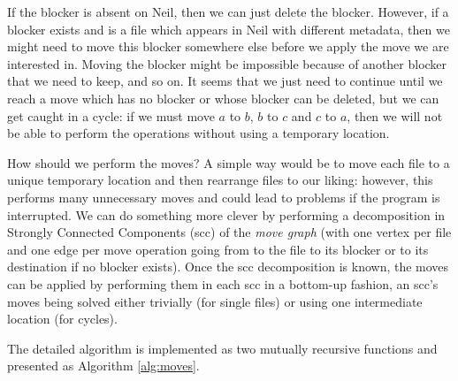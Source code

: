\documentclass[11pt]{llncs}
\begin{document}
If the blocker is absent on Neil, then we can just delete the blocker. However, if a blocker exists and is a file which appears in Neil with different metadata, then we might need to move this blocker somewhere else before we apply the move we are interested in. Moving the blocker might be impossible because of another blocker that we need to keep, and so on. It seems that we just need to continue until we reach a move which has no blocker or whose blocker can be deleted, but we can get caught in a cycle: if we must move $a$ to $b$, $b$ to $c$ and $c$ to $a$, then we will not be able to perform the operations without using a temporary location.

How should we perform the moves? A simple way would be to move each file to a unique temporary location and then rearrange files to our liking: however, this performs many unnecessary moves and could lead to problems if the program is interrupted. We can do something more clever by performing a decomposition in Strongly Connected Components ({\sc scc}) of the \textit{move graph} (with one vertex per file and one edge per move operation going from to the file to its blocker or to its destination if no blocker exists).
Once the {\sc scc} decomposition is known, the moves can be applied by performing them in each {\sc scc} in a bottom-up fashion, an {\sc scc}'s moves being solved either trivially (for single files) or using one intermediate location (for cycles).

The detailed algorithm is implemented as two mutually recursive functions and presented as Algorithm \ref{alg:moves}.
\end{document}
